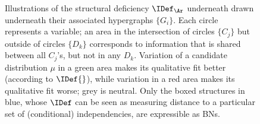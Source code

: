 \begin{figure}
	\addtocounter{figure}{-1} %
	\caption{
        Illustrations of the structural deficiency $\IDef_{\Ar}$ underneath
          drawn underneath their
		  associated hypergraphs $\{ G_i\}$. Each circle represents a
		  variable; an area in the intersection of circles $\{C_j\}$
		  but outside of circles $\{D_k\}$ corresponds to information
		  that is shared between all $C_j$'s, but not in any
		  $D_k$. Variation of a candidate distribution $\mu$ in a
		  green area makes its qualitative fit better (according to
		  $\IDef{}$), while variation in a red area makes its
		  qualitative fit worse; grey is neutral.
		  Only the boxed structures in blue,
		  whose $\IDef$ can be seen as measuring distance to a particular set of (conditional) independencies, are expressible as BNs.}
	\label{fig:info-diagram}
	\end{figure}
% 
